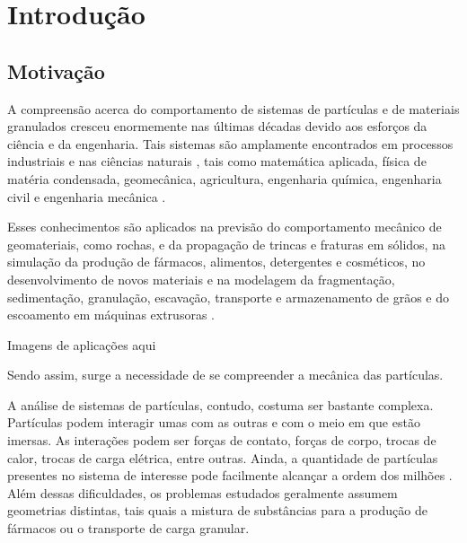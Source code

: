 \chapter[Introdução]{Introdução}

\section{Motivação} \label{sec:motivation}

A compreensão acerca do comportamento de sistemas de partículas e de materiais granulados cresceu enormemente nas últimas décadas devido aos esforços da ciência e da engenharia. Tais sistemas são amplamente encontrados em processos industriais e nas ciências naturais \cite{bib:computational_granular_dynamics}, tais como matemática aplicada, física de matéria condensada, geomecânica, agricultura, engenharia química, engenharia civil e engenharia mecânica \cite{bib:rolling}.

Esses conhecimentos são aplicados na previsão do comportamento mecânico de geomateriais, como rochas, e da propagação de trincas e fraturas em sólidos, na simulação da produção de fármacos, alimentos, detergentes e cosméticos, no desenvolvimento de novos materiais e na modelagem da fragmentação, sedimentação, granulação, escavação, transporte e armazenamento de grãos e do escoamento em máquinas extrusoras \cite{bib:donze,bib:poschel,bib:applications}.

\alert{Imagens de aplicações aqui}


Sendo assim, surge a necessidade de se compreender a mecânica das partículas.

A análise de sistemas de partículas, contudo, costuma ser bastante complexa. Partículas podem interagir umas com as outras e com o meio em que estão imersas. As interações podem ser forças de contato, forças de corpo, trocas de calor, trocas de carga elétrica, entre outras. Ainda, a quantidade de partículas presentes no sistema de interesse pode facilmente alcançar a ordem dos milhões \cite{bib:computational_granular_dynamics}. Além dessas dificuldades, os problemas estudados geralmente assumem geometrias distintas, tais quais a mistura de substâncias para a produção de fármacos ou o transporte de carga granular.

